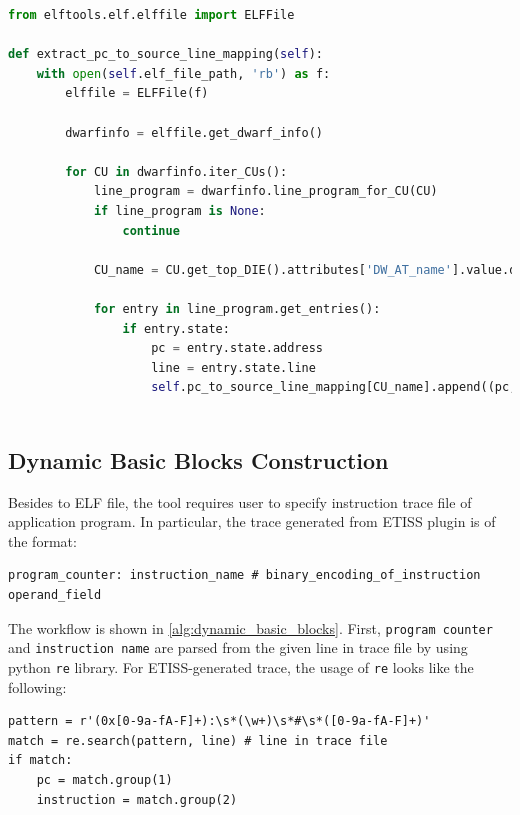 \medskip
 
\begin{lstlisting}[language=Python, caption={Function that extracts mapping between program counter and source code}, label=code:debug_line_mapping]
from elftools.elf.elffile import ELFFile

def extract_pc_to_source_line_mapping(self):
    with open(self.elf_file_path, 'rb') as f:
        elffile = ELFFile(f)

        dwarfinfo = elffile.get_dwarf_info()

        for CU in dwarfinfo.iter_CUs():
            line_program = dwarfinfo.line_program_for_CU(CU)
            if line_program is None:
                continue

            CU_name = CU.get_top_DIE().attributes['DW_AT_name'].value.decode('utf-8')

            for entry in line_program.get_entries():
                if entry.state:
                    pc = entry.state.address
                    line = entry.state.line
                    self.pc_to_source_line_mapping[CU_name].append((pc, line))
                    

\end{lstlisting}

\subsection{Dynamic Basic Blocks Construction}
\label{subsec:bb_construction}

Besides to ELF file, the tool requires user to specify instruction trace file of application program. In particular, the trace generated from ETISS plugin is of the format:  

\begin{lstlisting}
program_counter: instruction_name # binary_encoding_of_instruction operand_field    
\end{lstlisting}

The workflow is shown in \ref{alg:dynamic_basic_blocks}. First, \texttt{program counter} and \texttt{instruction name} are parsed from the given line in trace file by using python \texttt{re} library. For ETISS-generated trace, the usage of \texttt{re} looks like the following:

\medskip
\begin{lstlisting}
pattern = r'(0x[0-9a-fA-F]+):\s*(\w+)\s*#\s*([0-9a-fA-F]+)'
match = re.search(pattern, line) # line in trace file
if match:
    pc = match.group(1)
    instruction = match.group(2)
\end{lstlisting}
\medskip

